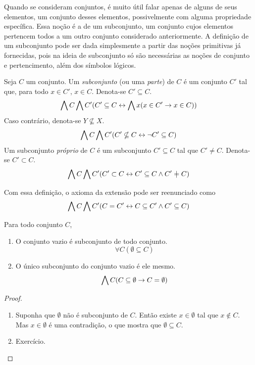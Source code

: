 Quando se consideram conjuntos, é muito útil falar apenas de alguns de seus elementos, um conjunto desses elementos, possivelmente com alguma propriedade específica. Essa noção é a de um subconjunto, um conjunto cujos elementos pertencem todos a um outro conjunto considerado anteriormente. A definição de um subconjunto pode ser dada simplesmente a partir das noções primitivas já fornecidas, pois na ideia de subconjunto só são necessárias as noções de conjunto e pertencimento, além dos símbolos lógicos.

\begin{definition}
Seja $C$ um conjunto. Um \emph{subconjunto} (ou uma \emph{parte}) de $C$ é um conjunto $C'$ tal que, para todo $x \in C'$, $x \in C$. Denota-se $C' \subseteq C$.
	\begin{equation*}
	\bigwedge\nolimits C \bigwedge\nolimits C' (C' \subseteq C \leftrightarrow \bigwedge\nolimits x (x \in C' \rightarrow x \in C))
	\end{equation*}
Caso contrário, denota-se $Y \nsubseteq X$.
	\begin{equation*}
	\bigwedge\nolimits C \bigwedge\nolimits C' (C' \nsubseteq C \leftrightarrow \lnot C' \subseteq C)
	\end{equation*}
Um subconjunto \emph{próprio} de $C$ é um subconjunto $C' \subseteq C$ tal que $C' \neq C$. Denota-se $C' \subset C$.
	\begin{equation*}
	\forall C \forall C' (C' \subset C \lequiv C' \subseteq C \lee C' \neq C)
	\end{equation*}
\end{definition}

Com essa definição, o axioma da extensão pode ser reenunciado como
	\begin{equation*}
	\bigwedge\nolimits C \bigwedge\nolimits C' (C = C' \leftrightarrow C \subseteq C' \land C' \subseteq C)
	\end{equation*}

\begin{proposition}
Para todo conjunto $C$,
	\begin{enumerate}
	\item O conjunto vazio é subconjunto de todo conjunto.
		\begin{equation*}
		\forall C(\emptyset \subseteq C)
		\end{equation*}
	\item O único subconjunto do conjunto vazio é ele mesmo.
		\begin{equation*}
		\bigwedge\nolimits C(C \subseteq \emptyset \rightarrow C = \emptyset)
		\end{equation*}
	\end{enumerate}
\end{proposition}
\begin{proof}
	\begin{enumerate}
	\item Suponha que $\emptyset$ não é subconjunto de $C$. Então existe $x \in \emptyset$ tal que $x \notin C$. Mas $x \in \emptyset$ é uma contradição, o que mostra que $\emptyset \subseteq C$.
	
	\item Exercício.
	\end{enumerate}
\end{proof}

